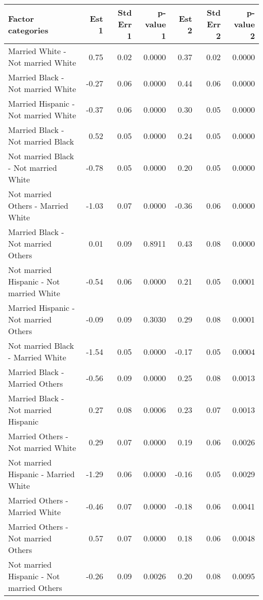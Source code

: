 \documentclass[11pt]{extarticle} %
\begin{document}
\begin{table}[H]
\footnotesize
\centering
\begin{tabular}{lrrrrrr}
  \hline
  Factor categories & Est 1 & Std Err 1 & p-value 1 & Est 2 & Std Err 2 & p-value 2 \\ 
  \hline
    Married White 	-  Not married White & 0.75 & 0.02 & 0.0000 & 0.37 & 0.02 & 0.0000 \\ 
    Married Black 	-  Not married White & -0.27 & 0.06 & 0.0000 & 0.44 & 0.06 & 0.0000 \\ 
    Married Hispanic 	-  Not married White & -0.37 & 0.06 & 0.0000 & 0.30 & 0.05 & 0.0000 \\ 
    Married Black 	-  Not married Black & 0.52 & 0.05 & 0.0000 & 0.24 & 0.05 & 0.0000 \\ 
    Not married Black 	-  Not married White & -0.78 & 0.05 & 0.0000 & 0.20 & 0.05 & 0.0000 \\ 
    Not married Others 	-  Married White & -1.03 & 0.07 & 0.0000 & -0.36 & 0.06 & 0.0000 \\ 
    Married Black 	-  Not married Others & 0.01 & 0.09 & 0.8911 & 0.43 & 0.08 & 0.0000 \\ 
    Not married Hispanic -  Not married White & -0.54 & 0.06 & 0.0000 & 0.21 & 0.05 & 0.0001 \\ 
    Married Hispanic 	-  Not married Others & -0.09 & 0.09 & 0.3030 & 0.29 & 0.08 & 0.0001 \\ 
    Not married Black 	-  Married White & -1.54 & 0.05 & 0.0000 & -0.17 & 0.05 & 0.0004 \\ 
    Married Black 	-  Married Others & -0.56 & 0.09 & 0.0000 & 0.25 & 0.08 & 0.0013 \\ 
    Married Black 	-  Not married Hispanic & 0.27 & 0.08 & 0.0006 & 0.23 & 0.07 & 0.0013 \\ 
    Married Others 	-  Not married White & 0.29 & 0.07 & 0.0000 & 0.19 & 0.06 & 0.0026 \\ 
    Not married Hispanic -  Married White & -1.29 & 0.06 & 0.0000 & -0.16 & 0.05 & 0.0029 \\ 
    Married Others 	-  Married White & -0.46 & 0.07 & 0.0000 & -0.18 & 0.06 & 0.0041 \\ 
    Married Others 	-  Not married Others & 0.57 & 0.07 & 0.0000 & 0.18 & 0.06 & 0.0048 \\ 
    Not married Hispanic -  Not married Others & -0.26 & 0.09 & 0.0026 & 0.20 & 0.08 & 0.0095 \\ 

\end{tabular}
\end{table}
\end{document}
